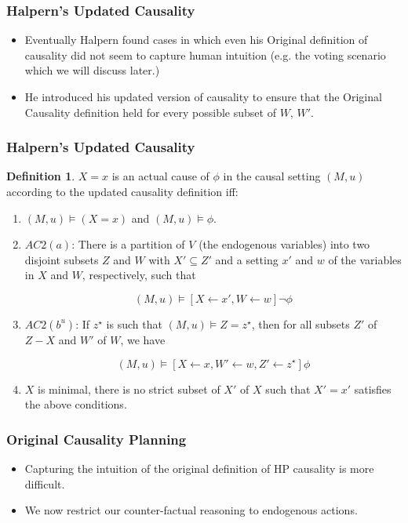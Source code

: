 \documentclass{beamer}
\theoremstyle{plain}
\theoremstyle{definition}
\newtheorem{defn}[thm]{Definition} %
\begin{document}
\begin{frame}
\frametitle{Halpern's Updated Causality}
\begin{itemize}


\item Eventually Halpern found cases in which even his Original definition of causality did not seem to capture human intuition (e.g. the voting scenario which we will discuss later.)
\item He introduced his updated version of causality to ensure that the Original Causality definition held for every possible subset of $W$, $W'$.
\end{itemize}
\end{frame}


\begin{frame}
\frametitle{Halpern's Updated Causality}
\begin{defn}$X=x$ is an actual cause of $\phi$ in the causal setting $(M,u)$ according to the updated causality definition iff:
\begin{enumerate}
\item $(M,u) \models (X=x)$ and $(M,u) \models \phi$.
\item $AC2(a)$: There is a partition of $V$ (the endogenous variables) into two disjoint subsets $Z$ and $W$ with $X'\subseteq Z'$ and a setting $x'$ and $w$ of the variables in $X$ and $W$, respectively, such that

\[
(M,u) \models [X\leftarrow x', W\leftarrow w]\lnot \phi
\] 

\item $AC2(b^u)$: If $z^\star$ is such that $(M,u)\models Z = z^\star$, then for all subsets $Z'$ of $Z-X$ and $W'$ of $W$, we have

\[
(M,u) \models [X\leftarrow x, W' \leftarrow w, Z' \leftarrow z^\star]\phi
\] 

\item $X$ is minimal, there is no strict subset of $X'$ of $X$ such that $X' = x'$ satisfies the above conditions.
\end{enumerate}

\end{defn}
\end{frame}








\begin{frame}
\frametitle{Original Causality Planning}
\begin{itemize}
\item Capturing the intuition of the original definition of HP causality is more difficult.
\item We now restrict our counter-factual reasoning to endogenous actions.
\end{itemize}

\end{frame}
\end{document}
